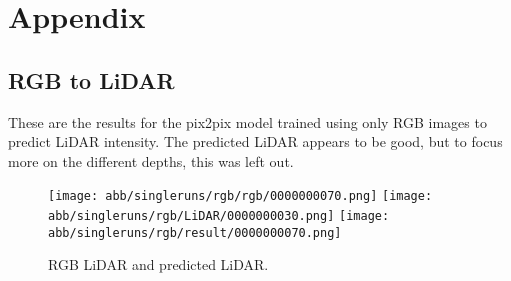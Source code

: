 \section{Appendix}
\subsection{RGB to LiDAR}

These are the results for the pix2pix model trained using only RGB images to predict LiDAR intensity. The predicted LiDAR appears to be good, but to focus more on the different depths, this was left out.
\begin{figure}[!ht]
	\centering
	\texttt{[image: abb/singleruns/rgb/rgb/0000000070.png]}
	\texttt{[image: abb/singleruns/rgb/LiDAR/0000000030.png]}
	\texttt{[image: abb/singleruns/rgb/result/0000000070.png]}
	\caption{RGB LiDAR and predicted LiDAR.}
	\label{rgb}
\end{figure}


